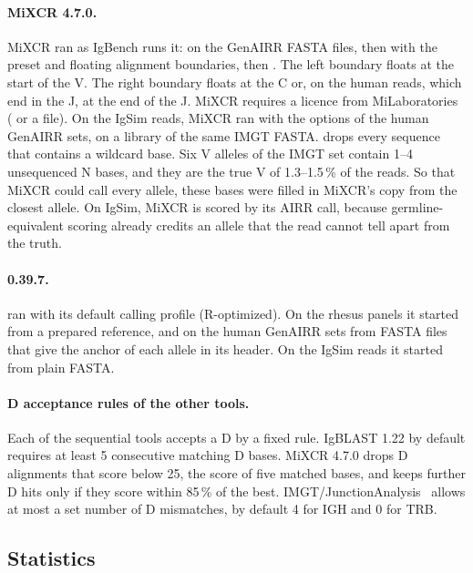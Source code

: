 \documentclass[11pt,a4paper]{article}
\begin{document}
\paragraph{MiXCR 4.7.0.} MiXCR ran as IgBench runs it: 
on the GenAIRR FASTA files, then  with the
 preset and floating alignment boundaries, then
. The left boundary floats at the start of the V. The right
boundary floats at the C or, on the human reads, which end in the J, at the
end of the J. MiXCR requires a licence from MiLaboratories
( or a  file). On the IgSim reads, MiXCR
ran with the options of the human GenAIRR sets, on a 
library of the same IMGT FASTA.  drops every sequence
that contains a wildcard base. Six V alleles of the IMGT set contain 1--4
unsequenced N bases, and they are the true V of 1.3--1.5\,\% of the reads.
So that MiXCR could call every allele, these bases were filled in MiXCR's
copy from the closest allele. On IgSim, MiXCR is scored by its AIRR call,
because germline-equivalent scoring already credits an allele that the read
cannot tell apart from the truth.

\paragraph{\swig{} 0.39.7.} \swig{} ran with its default calling profile
(R-optimized). On the rhesus panels it started from a prepared reference,
and on the human GenAIRR sets from FASTA files that give the anchor of each
allele in its header. On the IgSim reads it started from plain FASTA.

\paragraph{D acceptance rules of the other tools.} Each of the sequential
tools accepts a D by a fixed rule. IgBLAST 1.22 by default requires at least
5 consecutive matching D bases. MiXCR 4.7.0 drops D alignments that score
below 25, the score of five matched bases, and keeps further D hits only if
they score within 85\,\% of the best.
IMGT/JunctionAnalysis~\cite{yousfimonod2004junction} allows at most a set
number of D mismatches, by default 4 for IGH and 0 for TRB.

\subsection{Statistics}
\label{sec:protocol-stats}
\end{document}
